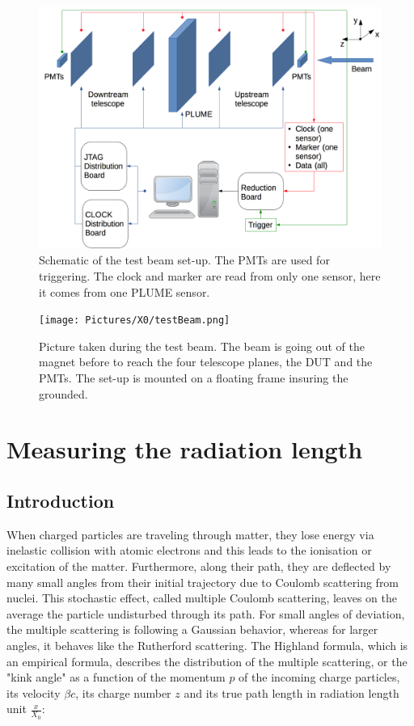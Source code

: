     \begin{figure}[!h]
      \centering
      \includegraphics[width = \textwidth]{Pictures/X0/testBeamAcquisition.png}
      \caption{Schematic of the test beam set-up. The PMTs are used for triggering. The clock and marker are read from only one sensor, here it comes from one PLUME sensor.}
      \label{fig:testBeamAcq}
    \end{figure}

    \begin{figure}
      \centering
      \texttt{[image: Pictures/X0/testBeam.png]}
      \caption{Picture taken during the test beam. The beam is going out of the magnet before to reach the four telescope planes, the DUT and the PMTs. The set-up is mounted on a floating frame insuring the grounded.}
      \label{fig:testBeam}
    \end{figure}

   
  \section{Measuring the radiation length}

    \subsection{Introduction}
    
    When charged particles are traveling through matter, they lose energy via inelastic collision with atomic electrons and this leads to the ionisation or excitation of the matter.
    Furthermore, along their path, they are deflected by many small angles from their initial trajectory due to Coulomb scattering from nuclei. 
    This stochastic effect, called multiple Coulomb scattering, leaves on the average the particle undisturbed through its path. 
    For small angles of deviation, the multiple scattering is following a Gaussian behavior, whereas for larger angles, it behaves like the Rutherford scattering.
    The Highland formula, which is an empirical formula, describes the distribution of the multiple scattering, or the "kink angle" as a function of the momentum $p$ of the incoming charge particles, its velocity $\beta c$, its charge number $z$ and its true path length in radiation length unit $\frac{x}{X_{0}}$:

